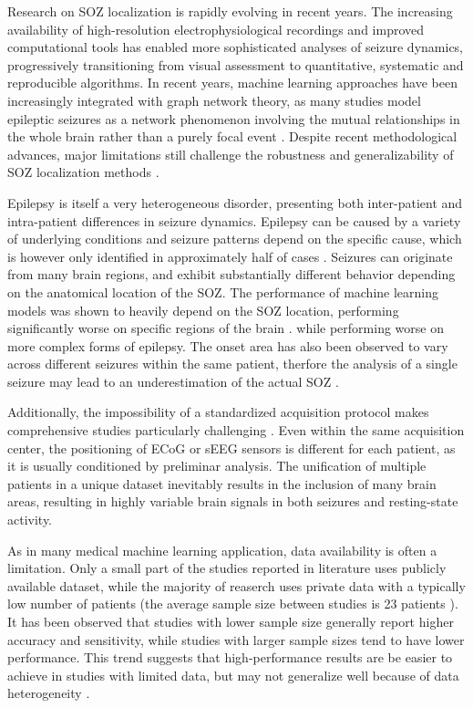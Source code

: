 Research on SOZ localization is rapidly evolving in recent years.
The increasing availability of high-resolution electrophysiological recordings
and improved computational tools has enabled more sophisticated analyses of
seizure dynamics, progressively transitioning from visual assessment to
quantitative, systematic and reproducible algorithms.
In recent years, machine learning approaches have been increasingly integrated
with graph network theory, as many studies model epileptic seizures as a
network phenomenon involving the mutual relationships in the whole brain
rather than a purely focal event \cite{ep-net1, ep-net2}. 
Despite recent methodological advances, major limitations still challenge the
robustness and generalizability of SOZ localization methods \cite{ep-rev}.

Epilepsy is itself a very heterogeneous disorder, presenting both inter-patient
and intra-patient differences in seizure dynamics.
Epilepsy can be caused by a variety of underlying conditions and seizure
patterns depend on the specific cause, which is however only identified in
approximately half of cases \cite{WHO2016Epilepsy}.
Seizures can originate from many brain regions, and exhibit substantially
different behavior depending on the anatomical location of the SOZ.
The performance of machine learning models was shown to heavily depend on the
SOZ location, performing significantly worse on specific regions of the brain
\cite{ep-rev}.
while performing worse on more complex forms of epilepsy.    
The onset area has also been observed to vary across different
seizures within the same patient,
therfore the analysis of a single seizure may lead to an underestimation of the
actual SOZ \cite{ep-hetero2}.

Additionally, the impossibility of a standardized acquisition protocol makes
comprehensive studies particularly challenging \cite{ep-rev}.
Even within the same acquisition center, the positioning of ECoG or sEEG
sensors is different for each patient, as it is usually conditioned by
preliminar analysis.
The unification of multiple patients in a unique dataset inevitably results in
the inclusion of many brain areas, resulting in highly variable brain signals
in both seizures and resting-state activity.

As in many medical machine learning application, data availability is often a
limitation.
Only a small part of the studies reported in literature uses publicly available
dataset, while the majority of reaserch uses private data with a typically
low number of patients (the average sample size between studies is 23 patients
\cite{ep-rev}).
It has been observed that studies with lower sample size generally report higher
accuracy and sensitivity, while studies with larger sample sizes tend to have 
lower performance. 
This trend suggests that high-performance results are be easier to achieve in
studies with limited data, but may not generalize well because of data
heterogeneity \cite{ep-rev2}. 

